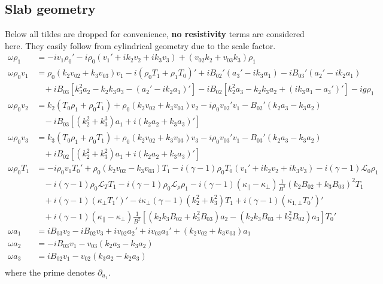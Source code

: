 \documentclass[11pt, fleqn]{article}
\newcommand{\HL}{\mathscr{L}}
\begin{document}
\subsection{Slab geometry}
Below all tildes are dropped for convenience, \textbf{no resistivity} terms are considered here. They easily follow from cylindrical geometry due to the scale factor.
\begin{equation}
	\begin{aligned}
		\omega \rho_1 		&= -iv_1\rho_0' - i\rho_0(v_1' + ik_2v_2 + ik_3v_3) + (v_{02}k_2 + v_{03}k_3)\rho_1																									\\[8pt]
		\omega \rho_0 v_1	&= \rho_0(k_2 v_{02} + k_3 v_{03})v_1 - i(\rho_0 T_1 + \rho_1 T_0)' + iB_{02}'(a_3' - ik_3a_1) - iB_{03}'(a_2' - ik_2a_1)															\\
							&~~~~ + iB_{03}\left[k_3^2a_2 - k_2k_3a_3 - (a_2' - ik_2a_1)'\right] - iB_{02}\left[k_2^2a_3 - k_2k_3a_2 + (ik_3a_1 - a_3')'\right]	 - ig\rho_1										\\[8pt]
		\omega \rho_0 v_2	&= k_2(T_0\rho_1 + \rho_0 T_1) + \rho_0(k_2 v_{02} + k_3v_{03})v_2 - i\rho_0v_{02}'v_1 - B_{02}'(k_2a_3 - k_3a_2) 																	\\
							&~~~~ - iB_{03}\left[(k_2^2 + k_3^3)a_1 + i(k_2a_2 + k_3a_3)'\right]																												\\[8pt]
		\omega \rho_0 v_3	&= k_3(T_0\rho_1 + \rho_0 T_1) + \rho_0(k_2 v_{02} + k_3v_{03})v_3 - i\rho_0v_{03}'v_1 - B_{03}'(k_2a_3 - k_3a_2)																	\\
							&~~~~ + iB_{02}\left[(k_2^2 + k_3^2)a_1 + i(k_2a_2 + k_3a_3)'\right]																												\\[8pt]
		\omega \rho_0 T_1	&= -i\rho_0v_1T_0' + \rho_0(k_2v_{02} - k_3v_{03})T_1 - i(\gamma - 1)\rho_0T_0(v_1' + ik_2v_2 + ik_3v_3) - i(\gamma - 1)\HL_0\rho_1													\\
							&~~~~ - i(\gamma - 1)\rho_0\HL_T T_1 - i(\gamma - 1)\rho_0\HL_\rho \rho_1 - i(\gamma - 1)(\kappa_\parallel - \kappa_\bot)\frac{1}{B^2}(k_2B_{02} + k_3B_{03})^2T_1					\\
							&~~~~ + i(\gamma - 1)(\kappa_\bot T_1')' - i\kappa_\bot(\gamma - 1)(k_2^2 + k_3^2)T_1 + i(\gamma - 1)(\kappa_{1, \bot}T_0')'														\\
							&~~~~ + i(\gamma - 1)(\kappa_\parallel - \kappa_\bot)\frac{1}{B^2}\left[(k_2k_3B_{02} + k_3^2B_{03})a_2 - (k_2k_3B_{03} + k_2^2B_{02})a_3\right]T_0'								\\[8pt]
		\omega a_1			&=  iB_{03}v_2 - iB_{02}v_3 + iv_{02}a_2' + iv_{03}a_3' + (k_2v_{02} + k_3v_{03})a_1																								\\[8pt]
		\omega a_2			&= -iB_{03}v_1 - v_{03}(k_2a_3 - k_3a_2)																																			\\[8pt]
		\omega a_3			&=  iB_{02}v_1 - v_{02}(k_3a_2 - k_2a_3)																																			\\
	\end{aligned}
\end{equation}
where the prime denotes $\partial_{u_1}$.
\end{document}
